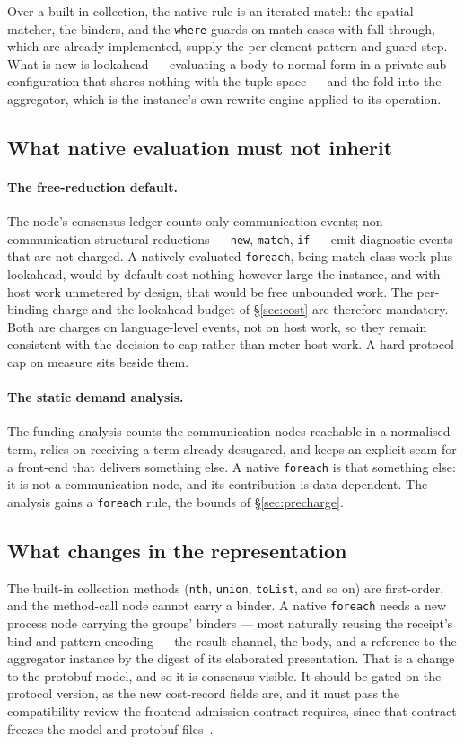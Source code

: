\documentclass[11pt]{article}
\theoremstyle{branddef}
\theoremstyle{brandplain}
\theoremstyle{brandrem}
\newcommand{\fe}{\texttt{foreach}}
\begin{document}
Over a built-in collection, the native rule is an iterated match: the spatial
matcher, the binders, and the \texttt{where} guards on match cases with
fall-through, which are already implemented, supply the per-element
pattern-and-guard step. What is new is lookahead --- evaluating a body to normal
form in a private sub-configuration that shares nothing with the tuple space ---
and the fold into the aggregator, which is the instance's own rewrite engine
applied to its operation.

\subsection{What native evaluation must not inherit}

\paragraph{The free-reduction default.} The node's consensus ledger counts
only communication events; non-communication structural reductions ---
\texttt{new}, \texttt{match}, \texttt{if} --- emit diagnostic events that are
not charged. A natively evaluated \fe{}, being match-class work plus lookahead,
would by default cost nothing however large the instance, and with host work
unmetered by design, that would be free unbounded work. The per-binding charge
and the lookahead budget of \S\ref{sec:cost} are therefore mandatory. Both are
charges on language-level events, not on host work, so they remain consistent
with the decision to cap rather than meter host work. A hard protocol cap on
measure sits beside them.

\paragraph{The static demand analysis.} The funding analysis counts the
communication nodes reachable in a normalised term, relies on receiving a term
already desugared, and keeps an explicit seam for a front-end that delivers
something else. A native \fe{} is that something else: it is not a
communication node, and its contribution is data-dependent. The analysis gains
a \fe{} rule, the bounds of \S\ref{sec:precharge}.

\subsection{What changes in the representation}

The built-in collection methods (\texttt{nth}, \texttt{union},
\texttt{toList}, and so on) are first-order, and the method-call node cannot
carry a binder. A native \fe{} needs a new process node carrying the groups'
binders --- most naturally reusing the receipt's bind-and-pattern encoding ---
the result channel, the body, and a reference to the aggregator instance by the
digest of its elaborated presentation. That is a change to the protobuf model,
and so it is consensus-visible. It should be gated on the protocol version, as
the new cost-record fields are, and it must pass the compatibility review the
frontend admission contract requires, since that contract freezes the model and
protobuf files~\cite{f1r3nodeOTE}.
\end{document}

